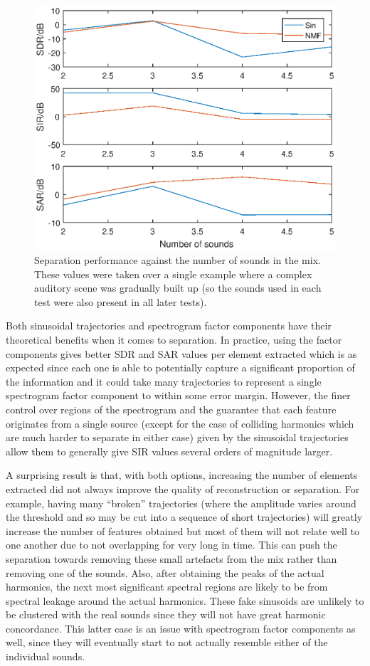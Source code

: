 \documentclass[12pt,a4paper,twoside,openright]{report}
\begin{document}
\begin{figure}
\centering
\includegraphics[width=0.7\linewidth]{./FeatureKGraph}
\caption[Separation performance against the number of sounds in the mix.]{Separation performance against the number of sounds in the mix. These values were taken over a single example where a complex auditory scene was gradually built up (so the sounds used in each test were also present in all later tests).}
\label{fig:FeatureKGraph}
\end{figure}


Both sinusoidal trajectories and spectrogram factor components have their theoretical benefits when it comes to separation. In practice, using the factor components gives better SDR and SAR values per element extracted which is as expected since each one is able to potentially capture a significant proportion of the information and it could take many trajectories to represent a single spectrogram factor component to within some error margin. However, the finer control over regions of the spectrogram and the guarantee that each feature originates from a single source (except for the case of colliding harmonics which are much harder to separate in either case) given by the sinusoidal trajectories allow them to generally give SIR values several orders of magnitude larger.

A surprising result is that, with both options, increasing the number of elements extracted did not always improve the quality of reconstruction or separation. For example, having many ``broken'' trajectories (where the amplitude varies around the threshold and so may be cut into a sequence of short trajectories) will greatly increase the number of features obtained but most of them will not relate well to one another due to not overlapping for very long in time. This can push the separation towards removing these small artefacts from the mix rather than removing one of the sounds. Also, after obtaining the peaks of the actual harmonics, the next most significant spectral regions are likely to be from spectral leakage around the actual harmonics. These fake sinusoids are unlikely to be clustered with the real sounds since they will not have great harmonic concordance. This latter case is an issue with spectrogram factor components as well, since they will eventually start to not actually resemble either of the individual sounds. 
\end{document}
